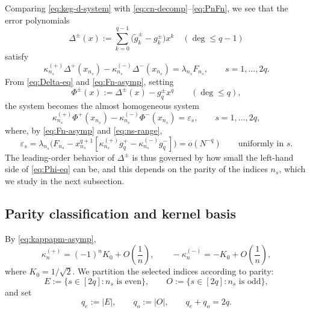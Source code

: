 \documentclass[11pt,a4paper]{article}
\theoremstyle{definition}
\begin{document}
Comparing \eqref{eq:keg-d-system} with
\eqref{eq:cn-decomp}--\eqref{eq:PnFn}, we see that the error polynomials
\[
\Delta^\pm(x):=\sum_{k=0}^{q-1}\bigl(\widetilde g_k^\pm-g_k^\pm\bigr)x^k
\quad(\deg\le q-1)
\]
satisfy
\begin{equation}\label{eq:Delta-eq}
\kappa_{n_s}^{(+)}\Delta^+(x_{n_s})
-\kappa_{n_s}^{(-)}\Delta^-(x_{n_s})
=\lambda_{n_s}F_{n_s},
\qquad s=1,\dots,2q.
\end{equation}
From \eqref{eq:Delta-eq} and \eqref{eq:Fn-asymp}, setting
\begin{equation}\label{eq:Phi-def}
\Phi^\pm(x):=\Delta^\pm(x)-g_q^\pm x^q\qquad(\deg\le q),
\end{equation}
the system becomes the almost homogeneous system
\begin{equation}\label{eq:Phi-eq}
\kappa_{n_s}^{(+)}\Phi^+(x_{n_s})-\kappa_{n_s}^{(-)}\Phi^-(x_{n_s})=\varepsilon_s,
\qquad s=1,\dots,2q,
\end{equation}
where, by \eqref{eq:Fn-asymp} and \eqref{eq:ns-range},
\begin{equation}\label{eq:eps-small}
\varepsilon_s=\lambda_{n_s}\bigl(F_{n_s}
   -x_{n_s}^{q+1}[\kappa_{n_s}^{(+)}g_q^+-\kappa_{n_s}^{(-)}g_q^-]\bigr)
 =o(N^{-q})\qquad\text{uniformly in }s.
\end{equation}
The leading-order behavior of $\Delta^\pm$ is thus governed by how
small the left-hand side of \eqref{eq:Phi-eq} can be, and this depends
on the parity of the indices $n_s$, which we study in the next
subsection.

\subsection{Parity classification and kernel basis}\label{ssec:parity}

By \eqref{eq:kappapm-asymp},
\begin{equation}\label{eq:kappa-leading}
\kappa_n^{(+)}
=
(-1)^nK_0+O\!\left(\frac{1}{n}\right),
\qquad
-\kappa_n^{(-)}
=
-K_0+O\!\left(\frac{1}{n}\right),
\end{equation}
where \(K_0=1/\sqrt{2}\). We partition the selected indices according
to parity:
\[
E:=\{s\in[2q]:n_s\text{ is even}\},
\qquad
O:=\{s\in[2q]:n_s\text{ is odd}\},
\]
and set
\[
q_e:=|E|,
\qquad
q_o:=|O|,
\qquad
q_e+q_o=2q.
\]
\end{document}
